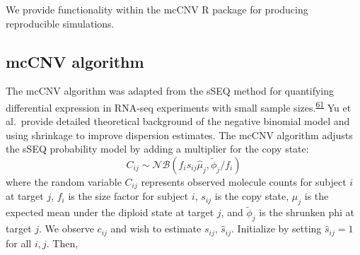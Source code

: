 \documentclass[11pt,letterpaper]{book}
\begin{document}
We provide functionality within the mcCNV R package for producing reproducible simulations.

\hypertarget{mccnv-algorithm}{%
\subsection{mcCNV algorithm}\label{mccnv-algorithm}}

The mcCNV algorithm was adapted from the sSEQ method for quantifying differential expression in RNA-seq experiments with small sample sizes.\textsuperscript{\protect\hyperlink{ref-yu:2013aa}{61}}
Yu et al.~provide detailed theoretical background of the negative binomial model and using shrinkage to improve dispersion estimates.
The mcCNV algorithm adjusts the sSEQ probability model by adding a multiplier for the copy state:
\[
  C_{ij} \sim \mathcal{NB}(f_is_{ij}\hat\mu_j, \tilde\phi_j/f_i)
\]
where the random variable \(C_{ij}\) represents observed molecule counts for subject \(i\) at target \(j\), \(f_i\) is the size factor for subject \(i\), \(s_{ij}\) is the copy state, \(\mu_j\) is the expected mean under the diploid state at target \(j\), and \(\tilde\phi_j\) is the shrunken phi at target \(j\).
We observe \(c_{ij}\) and wish to estimate \(s_{ij}\), \(\hat{s}_{ij}\).
Initialize by setting \(\hat{s}_{ij} = 1\) for all \(i,j\). Then,
\end{document}
